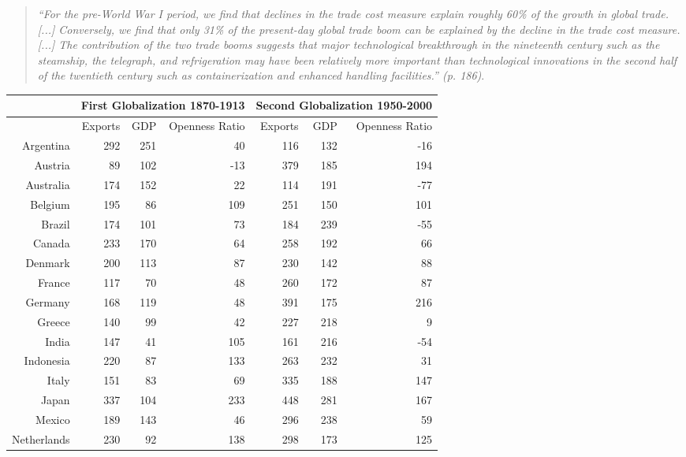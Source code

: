 \documentclass{article}
\begin{document}
\begin{quote}
\emph{``For the pre-World War I period, we find that declines
in the trade cost measure explain roughly 60\% of the growth in
global trade. [...] Conversely, we find that only 31\% of the
present-day global trade boom can be explained by the decline
in the trade cost measure. [...] The contribution of the two
trade booms suggests that major technological breakthrough in
the nineteenth century such as the steamship, the telegraph,
and refrigeration may have been relatively more important than
technological innovations in the second half of the twentieth
century such as containerization and enhanced handling
facilities.'' (p. 186)}.
\end{quote}


\begin{table}
\centering
\begin{tabular}{|r|r|r|r|r|r|r|}
\hline
 & \multicolumn{3}{|c|}{First Globalization 1870-1913} & \multicolumn{3}{|c|}{Second Globalization 1950-2000}\\
\hline
 & Exports & GDP & Openness Ratio & Exports & GDP & Openness Ratio\\
\hline
Argentina & 292 & 251 & 40 & 116 & 132 & -16\\
\hline
Austria & 89 & 102 & -13 & 379 & 185 & 194\\
\hline
Australia & 174 & 152 & 22 & 114 & 191 & -77\\
\hline
Belgium & 195 & 86 & 109 & 251 & 150 & 101\\
\hline
Brazil & 174 & 101 & 73 & 184 & 239 & -55\\
\hline
Canada & 233 & 170 & 64 & 258 & 192 & 66\\
\hline
Denmark & 200 & 113 & 87 & 230 & 142 & 88\\
\hline
France & 117 & 70 & 48 & 260 & 172 & 87\\
\hline
Germany & 168 & 119 & 48 & 391 & 175 & 216\\
\hline
Greece & 140 & 99 & 42 & 227 & 218 & 9\\
\hline
India & 147 & 41 & 105 & 161 & 216 & -54\\
\hline
Indonesia & 220 & 87 & 133 & 263 & 232 & 31\\
\hline
Italy & 151 & 83 & 69 & 335 & 188 & 147\\
\hline
Japan & 337 & 104 & 233 & 448 & 281 & 167\\
\hline
Mexico & 189 & 143 & 46 & 296 & 238 & 59\\
\hline
Netherlands & 230 & 92 & 138 & 298 & 173 & 125\\

\end{tabular}
\end{table}
\end{document}
